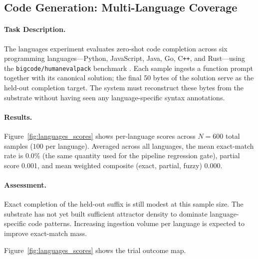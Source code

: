 \subsection{Code Generation: Multi-Language Coverage}
\label{sec:codegen_languages}

\paragraph{Task Description.}
The languages experiment evaluates zero-shot code completion across six
programming languages---Python, JavaScript, Java, Go, C\texttt{++}, and
Rust---using the \texttt{bigcode/humanevalpack} benchmark \cite{muennighoff2023octopack}.
Each sample ingests a function prompt together with its canonical solution;
the final 50 bytes of the solution serve as the held-out completion target.
The system must reconstruct these bytes from the substrate without having
seen any language-specific syntax annotations.

\paragraph{Results.}
Figure~\ref{fig:languages_scores} shows per-language scores across
$N = 600$ total samples ($100$ per language).
Averaged across all languages, the mean exact-match rate is 0.0\% (the same
quantity used for the pipeline regression gate), partial score 0.001,
and mean weighted composite (exact, partial, fuzzy) 0.000.

\paragraph{Assessment.}
Exact completion of the held-out suffix is still modest at this sample size.
The substrate has not yet built sufficient attractor density to dominate
language-specific code patterns. Increasing ingestion volume per language
is expected to improve exact-match mass.

Figure~\ref{fig:languages_scores} shows the trial outcome map.
